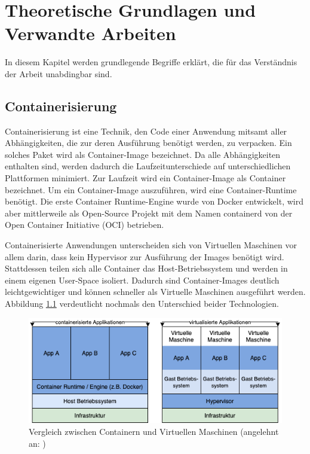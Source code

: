 \chapter{Theoretische Grundlagen und Verwandte Arbeiten}
In diesem Kapitel werden grundlegende Begriffe erklärt, die für das Verständnis der Arbeit unabdingbar sind.

\section{Containerisierung}
Containerisierung ist eine Technik, den Code einer Anwendung mitsamt aller Abhängigkeiten, die zur deren Ausführung benötigt werden, zu verpacken. Ein solches Paket wird als Container-Image bezeichnet. Da alle Abhängigkeiten enthalten sind, werden dadurch die Laufzeitunterschiede auf unterschiedlichen Plattformen minimiert\cite{noauthor_what_nodate}. Zur Laufzeit wird ein Container-Image als Container bezeichnet. Um ein Container-Image auszuführen, wird eine Container-Runtime benötigt. Die erste Container Runtime-Engine wurde von Docker entwickelt, wird aber mittlerweile als Open-Source Projekt mit dem Namen containerd von der Open Container Initiative (OCI) betrieben\cite{noauthor_what_nodate}. 

Containerisierte Anwendungen unterscheiden sich von Virtuellen Maschinen vor allem darin, dass kein Hypervisor zur Ausführung der Images benötigt wird. Stattdessen teilen sich alle Container das Host-Betriebssystem und werden in einem eigenen User-Space isoliert. Dadurch sind Container-Images deutlich leichtgewichtiger und können schneller als Virtuelle Maschinen ausgeführt werden\cite{noauthor_what_nodate}. Abbildung \ref{fig:containerVsVMs} verdeutlicht nochmals den Unterschied beider Technologien.

\begin{figure}[H]
    \includegraphics[width=\textwidth]{img/container-vs-vms.png}
    
    \caption[Vergleich zwischen Containern und Virtuellen Maschinen]{Vergleich zwischen Containern und Virtuellen Maschinen (angelehnt an: \cite{noauthor_what_nodate})}
    \label{fig:containerVsVMs}
\end{figure}

